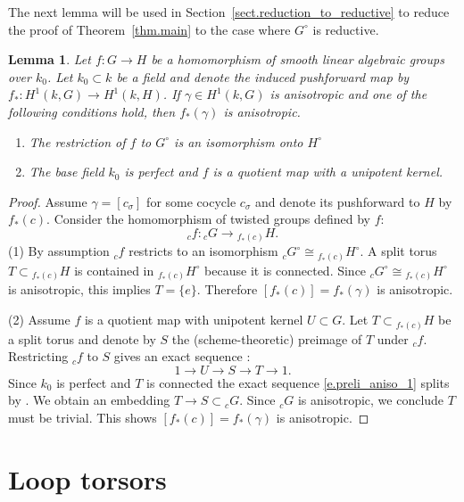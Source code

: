 \documentclass[12pt]{amsart}
\numberwithin{equation}{section}
\newtheorem{lemma}[theorem]{Lemma}
\theoremstyle{definition}
\begin{document}
 The next lemma will be used in Section~\ref{sect.reduction_to_reductive} to reduce the proof of Theorem~\ref{thm.main} to the case where $G^{\circ}$ is reductive.
\begin{lemma}\label{lem.aniso_image}
    Let $f: G\to H$ be a homomorphism of smooth linear algebraic groups over $k_0$. Let $k_0\subset k$ be a field and denote the induced pushforward map by $f_*: H^1(k,G)\to H^1(k,H)$. If $\gamma\in H^1(k,G)$ is anisotropic and one of the following conditions hold, then $f_*(\gamma)$ is anisotropic.
    \begin{enumerate}
        \item The restriction of $f$ to $G^{\circ}$ is an isomorphism onto $H^{\circ}$
        \item The base field $k_0$ is perfect and $f$ is a quotient map with a unipotent kernel.
    \end{enumerate}
\end{lemma}
\begin{proof}
Assume $\gamma = [c_\sigma]$ for some cocycle $c_\sigma$ and denote its pushforward to $H$ by $f_*(c)$. Consider the homomorphism of twisted groups defined by $f$:
$${}_c f : {}_{c} G \to {}_{f_*(c)} H.$$
(1) By assumption ${}_c f$ restricts to an isomorphism ${}_c G^{\circ} \cong {}_{f_*(c)}H^{\circ}$. A split torus $T\subset {}_{f_*(c)}H$ is contained in ${}_{f_*(c)}H^{\circ}$ because it is connected. Since ${}_c G^{\circ} \cong {}_{f_*(c)}H^{\circ}$ is anisotropic, this implies  $T=\{e\}$. Therefore $[f_*(c)]=f_*(\gamma)$ is anisotropic.

\smallskip
(2) Assume $f$ is a quotient map with unipotent kernel $U\subset G$. Let $T\subset {}_{f_*(c)} H$ be a split torus and denote by $S$ the (scheme-theoretic) preimage of $T$ under ${}_c f$. Restricting ${}_c f$ to $S$ gives an exact sequence \cite[Theorem 5.55]{milne2017algebraic}:
\begin{equation}\label{e.preli_aniso_1}
1 \to U \to S \to T\to 1.
\end{equation}
Since $k_0$ is perfect and $T$ is connected the exact sequence \eqref{e.preli_aniso_1} splits by \cite[Expose XVII, Theorem 5.1.1]{SGA3}. We obtain an embedding $T\to S \subset {}_c G$. Since ${}_c G$ is anisotropic, we conclude $T$ must be trivial. This shows $[f_*(c)]=f_*(\gamma)$ is anisotropic.

\end{proof}

\section{Loop torsors}\label{sect.loop_torsors}
\end{document}
